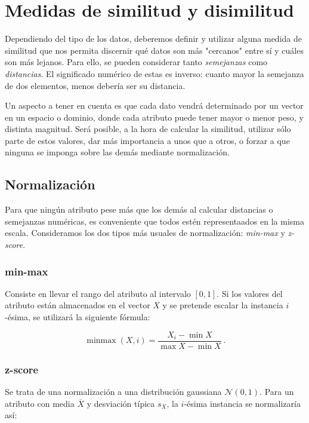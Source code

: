 \documentclass[a4paper,11pt,spanish]{report}
\let\stdsection\section
\let\stdsub\subsection
\let\stdsubsub\subsubsection
\renewcommand{\chapter}{\stdsection}
\renewcommand{\section}{\stdsub}
\renewcommand{\subsection}{\stdsubsub}
\begin{document}
\chapter{Medidas de similitud y disimilitud}
\label{sec-1-2}

Dependiendo del tipo de los datos, deberemos definir y utilizar alguna medida de similitud que nos permita discernir qué datos son más "cercanos" entre sí y cuáles son más lejanos. Para ello, se pueden considerar tanto \emph{semejanzas} como \emph{distancias}. El significado numérico de estas es inverso: cuanto mayor la semejanza de dos elementos, menos debería ser su distancia.

Un aspecto a tener en cuenta es que cada dato vendrá determinado por un vector en un espacio o dominio, donde cada atributo puede tener mayor o menor peso, y distinta magnitud. Será posible, a la hora de calcular la similitud, utilizar sólo parte de estos valores, dar más importancia a unos que a otros, o forzar a que ninguna se imponga sobre las demás mediante normalización.

\section{Normalización}
\label{sec-1-2-1}

Para que ningún atributo pese más que los demás al calcular distancias o semejanzas numéricas, es conveniente que todos estén representaados en la misma escala. Consideramos los dos tipos más usuales de normalización: \emph{min-max} y \emph{z-score}.

\subsection*{min-max}
\label{sec-1-2-1-1}

Consiste en llevar el rango del atributo al intervalo $[0,1]$. Si los valores del atributo están almacenados en el vector $X$ y se pretende escalar la instancia $i$-ésima, se utilizará la siguiente fórmula:

$$\operatorname{minmax}(X, i) = \frac{X_i - \min X}{\max X - \min X}~.$$

\subsection*{z-score}
\label{sec-1-2-1-2}

Se trata de una normalización a una distribución gaussiana $\mathcal N(0,1)$. Para un atributo con media $\overline X$ y desviación típica $s_X$, la $i$-ésima instancia se normalizaría así:
\end{document}
